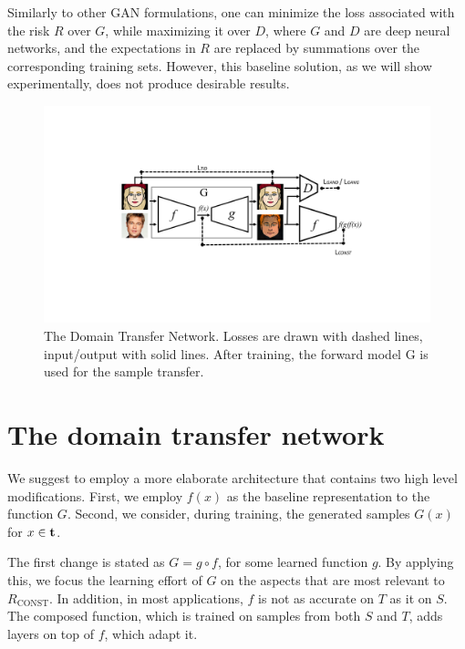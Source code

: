 \documentclass{article} %
\begin{document}
Similarly to other GAN formulations, one can minimize the loss associated with the risk $R$ over $G$, while maximizing it over $D$, where $G$ and $D$ are deep neural networks, and the expectations in $R$ are replaced by summations over the corresponding training sets. However, this baseline solution, as we will show experimentally, does not produce desirable results.

\begin{figure}[H]
\centering
\includegraphics[trim=180 150 170 150, clip, width=0.9\linewidth]{emojiganfig1_bw.png}
\caption{\label{fig:illustration}The Domain Transfer Network. Losses are drawn with dashed lines, input/output with solid lines. After training, the forward model G is used for the sample transfer.}
\end{figure}

\section{The domain transfer network}

We suggest to employ a more elaborate architecture that contains two high level modifications. First, we employ $f(x)$ as the baseline representation to the function $G$. Second, we consider, during training, the generated samples $G(x)$ for $x \in \textbf t$. 

The first change is stated as $G=g \circ f$, for some learned function $g$. By applying this, we focus the learning effort of $G$ on the aspects that are most relevant to $R_\text{CONST}$. In addition, in most applications, $f$ is not as accurate on $T$ as it on $S$. The composed function, which is trained on samples from both $S$ and $T$,  adds layers on top of $f$, which adapt it. 
\end{document}
